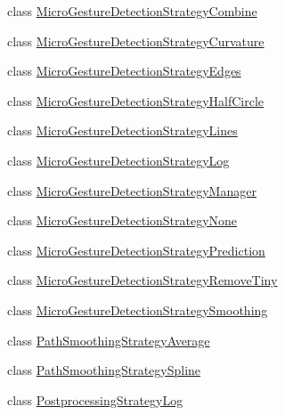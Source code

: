 \begin{DoxyCompactItemize}
class \hyperlink{classch_1_1zhaw_1_1ba10__bsha__1_1_1strategies_1_1MicroGestureDetectionStrategyCombine}{MicroGestureDetectionStrategyCombine}
\item 
class \hyperlink{classch_1_1zhaw_1_1ba10__bsha__1_1_1strategies_1_1MicroGestureDetectionStrategyCurvature}{MicroGestureDetectionStrategyCurvature}
\item 
class \hyperlink{classch_1_1zhaw_1_1ba10__bsha__1_1_1strategies_1_1MicroGestureDetectionStrategyEdges}{MicroGestureDetectionStrategyEdges}
\item 
class \hyperlink{classch_1_1zhaw_1_1ba10__bsha__1_1_1strategies_1_1MicroGestureDetectionStrategyHalfCircle}{MicroGestureDetectionStrategyHalfCircle}
\item 
class \hyperlink{classch_1_1zhaw_1_1ba10__bsha__1_1_1strategies_1_1MicroGestureDetectionStrategyLines}{MicroGestureDetectionStrategyLines}
\item 
class \hyperlink{classch_1_1zhaw_1_1ba10__bsha__1_1_1strategies_1_1MicroGestureDetectionStrategyLog}{MicroGestureDetectionStrategyLog}
\item 
class \hyperlink{classch_1_1zhaw_1_1ba10__bsha__1_1_1strategies_1_1MicroGestureDetectionStrategyManager}{MicroGestureDetectionStrategyManager}
\item 
class \hyperlink{classch_1_1zhaw_1_1ba10__bsha__1_1_1strategies_1_1MicroGestureDetectionStrategyNone}{MicroGestureDetectionStrategyNone}
\item 
class \hyperlink{classch_1_1zhaw_1_1ba10__bsha__1_1_1strategies_1_1MicroGestureDetectionStrategyPrediction}{MicroGestureDetectionStrategyPrediction}
\item 
class \hyperlink{classch_1_1zhaw_1_1ba10__bsha__1_1_1strategies_1_1MicroGestureDetectionStrategyRemoveTiny}{MicroGestureDetectionStrategyRemoveTiny}
\item 
class \hyperlink{classch_1_1zhaw_1_1ba10__bsha__1_1_1strategies_1_1MicroGestureDetectionStrategySmoothing}{MicroGestureDetectionStrategySmoothing}
\item 
class \hyperlink{classch_1_1zhaw_1_1ba10__bsha__1_1_1strategies_1_1PathSmoothingStrategyAverage}{PathSmoothingStrategyAverage}
\item 
class \hyperlink{classch_1_1zhaw_1_1ba10__bsha__1_1_1strategies_1_1PathSmoothingStrategySpline}{PathSmoothingStrategySpline}
\item 
class \hyperlink{classch_1_1zhaw_1_1ba10__bsha__1_1_1strategies_1_1PostprocessingStrategyLog}{PostprocessingStrategyLog}
\item 

\end{DoxyCompactItemize}
